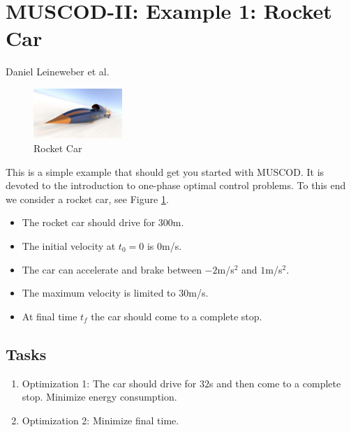 \documentclass[a4paper,english,12pt]{report}
\newcommand{\muscod}[0]{\textsc{MUSCOD-II}}
\begin{document}
\thispagestyle{empty}


\section*{\muscod{}: Example 1: Rocket Car} 



Daniel Leineweber et al.

\begin{figure}
	\begin{center}
		\includegraphics[width=0.3\textwidth]{rocketcar}
	\end{center}
	\caption{Rocket Car}
	\label{fig:rocketcar}
\end{figure}

\bigskip
\bigskip

This is a simple example that should get you started with MUSCOD. It is devoted to the introduction to one-phase optimal control problems. To this end we consider a rocket car, see Figure \ref{fig:rocketcar}.

\begin{itemize}
 \item The rocket car should drive for $300$m.
 \item The initial velocity at $t_0 = 0$ is $0$m/s. 
 \item The car can accelerate and brake between $-2$m/s$^2$ and $1$m/s$^2$.
 \item The maximum velocity is limited to $30$m/s.
 \item At final time $t_f$ the car should come to a complete stop. 
\end{itemize}


 
\subsection*{Tasks}

\begin{enumerate}
	\item Optimization 1: The car should drive for $32$s and then come to a complete stop. Minimize energy consumption.
	\item Optimization 2: Minimize final time.
\end{enumerate}
\medskip
\end{document}
